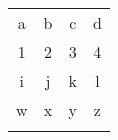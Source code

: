 \documentclass[12pt]{article}
\begin{document}
\begin{tabular}{||cc||c|c||}
\hhline{|t:==:t:==:t|}
a&b&c&d\\ \hhline{|:==:|~|~||}
1&2&3&4\\ \hhline{#==#~|=#}
i&j&k&l\\ \hhline{||==||==||}
w&x&y&z\\ \hhline{|b:==:b:==:b|}
\end{tabular}
\end{document}
